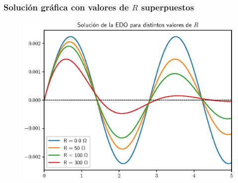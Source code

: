 \documentclass[12pt]{beamer}
\begin{document}
\begin{frame}
\frametitle{Solución gráfica con valores de $R$ superpuestos}
\begin{figure}
    \centering
    \includegraphics[scale=0.55]{Imagenes/plot_Ejercicio_odeint_03_Circuito_RLC.eps}
\end{figure}
\end{frame}
%     
\end{document}
